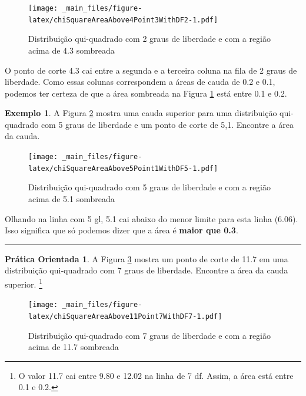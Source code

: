 \documentclass[
]{book}
\theoremstyle{definition}
\theoremstyle{definition}
\newtheorem{example}{Exemplo}[chapter]
\theoremstyle{definition}
\newtheorem{exercise}{Prática Orientada}[chapter]
\theoremstyle{definition}
\theoremstyle{remark}
\begin{document}
\begin{figure}
\centering
\texttt{[image: \_main\_files/figure-latex/chiSquareAreaAbove4Point3WithDF2-1.pdf]}
\caption{\label{fig:chiSquareAreaAbove4Point3WithDF2}Distribuição qui-quadrado com 2 graus de liberdade e com a região acima de 4.3 sombreada}
\end{figure}

O ponto de corte 4.3 cai entre a segunda e a terceira coluna na fila de 2 graus de liberdade. Como essas colunas correspondem a áreas de cauda de 0.2 e 0.1, podemos ter certeza de que a área sombreada na Figura \ref{fig:chiSquareAreaAbove4Point3WithDF2} está entre 0.1 e 0.2.

\begin{example}
\protect\hypertarget{exm:unnamed-chunk-240}{}{\label{exm:unnamed-chunk-240} }A Figura \ref{fig:chiSquareAreaAbove5Point1WithDF5} mostra uma cauda superior para uma distribuição qui-quadrado com 5 graus de liberdade e um ponto de corte de 5,1. Encontre a área da cauda.
\end{example}

\begin{figure}
\centering
\texttt{[image: \_main\_files/figure-latex/chiSquareAreaAbove5Point1WithDF5-1.pdf]}
\caption{\label{fig:chiSquareAreaAbove5Point1WithDF5}Distribuição qui-quadrado com 5 graus de liberdade e com a região acima de 5.1 sombreada}
\end{figure}

Olhando na linha com 5 gl, 5.1 cai abaixo do menor limite para esta linha (6.06). Isso significa que só podemos dizer que a área é \textbf{maior que 0.3}.

\begin{center}\rule{0.5\linewidth}{0.5pt}\end{center}

\begin{exercise}
\protect\hypertarget{exr:unnamed-chunk-241}{}{\label{exr:unnamed-chunk-241} }A Figura \ref{fig:chiSquareAreaAbove11Point7WithDF7} mostra um ponto de corte de 11.7 em uma distribuição qui-quadrado com 7 graus de liberdade. Encontre a área da cauda superior. \footnote{O valor 11.7 cai entre 9.80 e 12.02 na linha de 7 df. Assim, a área está entre 0.1 e 0.2.}
\end{exercise}

\begin{figure}
\centering
\texttt{[image: \_main\_files/figure-latex/chiSquareAreaAbove11Point7WithDF7-1.pdf]}
\caption{\label{fig:chiSquareAreaAbove11Point7WithDF7}Distribuição qui-quadrado com 7 graus de liberdade e com a região acima de 11.7 sombreada}
\end{figure}
\end{document}
